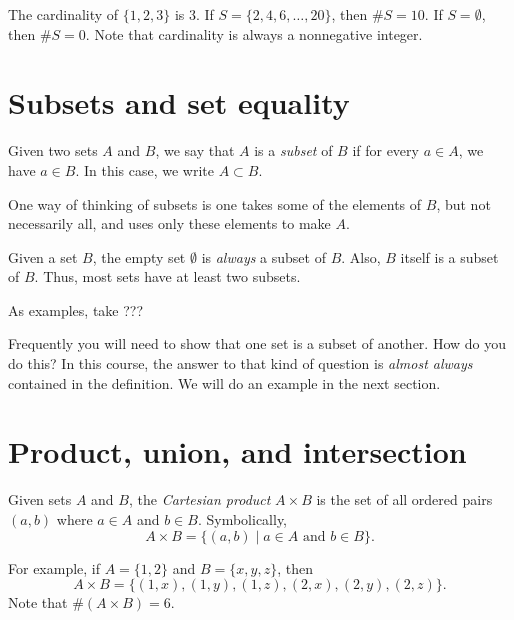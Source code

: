 \documentclass{tufte-book}
\begin{document}
The cardinality of $\{1, 2, 3\}$ is 3. If $S = \{2, 4, 6, \dots, 20\}$, then $\# S = 10$. If $S = \emptyset$, then $\# S = 0$. Note that cardinality is always a nonnegative integer. 

\section{Subsets and set equality}
\label{sec:subsets}

\begin{definition}
  Given two sets $A$ and $B$, we say that $A$ is a \emph{subset}  of $B$ if for every $a \in A$, we have $a \in B$. In this case, we write $A \subset B$. 
\end{definition}
One way of thinking of subsets is one takes some of the elements of $B$, but not necessarily all, and uses only these elements to make $A$.

Given a set $B$, the empty set $\emptyset$ is \emph{always} a subset of $B$. Also, $B$ itself is a subset of $B$. Thus, most sets have at least two subsets.

As examples, take ???

Frequently you will need to show that one set is a subset of another. How do you do this? In this course, the answer to that kind of question is \emph{almost always} contained in the definition. We will do an example in the next section.

\section{Product, union, and intersection}
\label{sec:prod-union-inters}

\begin{definition}
  Given sets $A$ and $B$, the \emph{Cartesian product} $A \times B$ is the set of all ordered pairs $(a, b)$ where $a \in A$ and $b \in B$. Symbolically,
  \[
  A \times B = \{(a,b) \mid a \in A \text{ and } b \in B\}.
  \]
\end{definition}
For example, if $A = \{1, 2\}$ and $B = \{x, y, z\}$, then
\[
A \times B = \{(1, x), (1, y), (1, z), (2, x), (2, y), (2, z)\}.
\]
Note that $\#(A \times B) = 6$.
\end{document}
